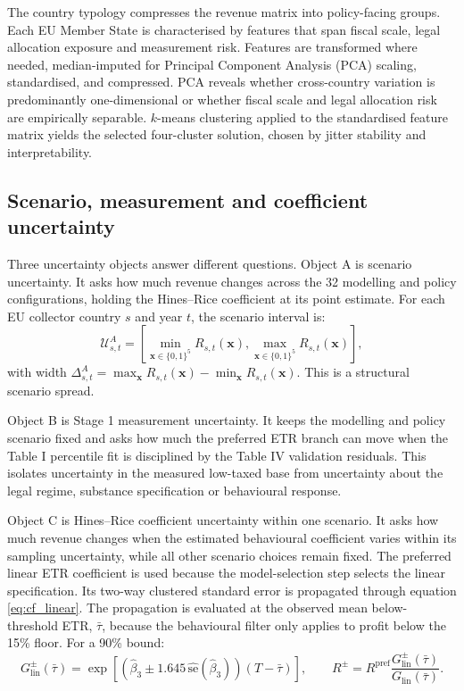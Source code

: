 \documentclass[11pt,a4paper]{article}
\begin{document}
The country typology compresses the revenue matrix into policy-facing groups. Each EU Member State is characterised by features that span fiscal scale, legal allocation exposure and measurement risk. Features are transformed where needed, median-imputed for Principal Component Analysis (PCA) scaling, standardised, and compressed. PCA reveals whether cross-country variation is predominantly one-dimensional or whether fiscal scale and legal allocation risk are empirically separable. $k$-means clustering applied to the standardised feature matrix yields the selected four-cluster solution, chosen by jitter stability and interpretability. 

\subsection{Scenario, measurement and coefficient uncertainty}\label{sec:two_uncertainties}

Three uncertainty objects answer different questions. Object A is scenario uncertainty. It asks how much revenue changes across the 32 modelling and policy configurations, holding the Hines--Rice coefficient at its point estimate. For each EU collector country $s$ and year $t$, the scenario interval is:
\begin{equation}\label{eq:object_a}
\mathcal{U}^{A}_{s,t}
=
\left[
\min_{\mathbf{x}\in\{0,1\}^5} R_{s,t}(\mathbf{x}),
\max_{\mathbf{x}\in\{0,1\}^5} R_{s,t}(\mathbf{x})
\right],
\end{equation}
with width $\Delta^{A}_{s,t}=\max_{\mathbf{x}}R_{s,t}(\mathbf{x})-\min_{\mathbf{x}}R_{s,t}(\mathbf{x})$. This is a structural scenario spread.

Object B is Stage 1 measurement uncertainty. It keeps the modelling and policy scenario fixed and asks how much the preferred ETR branch can move when the Table I percentile fit is disciplined by the Table IV validation residuals. This isolates uncertainty in the measured low-taxed base from uncertainty about the legal regime, substance specification or behavioural response.

Object C is Hines--Rice coefficient uncertainty within one scenario. It asks how much revenue changes when the estimated behavioural coefficient varies within its sampling uncertainty, while all other scenario choices remain fixed. The preferred linear ETR coefficient is used because the model-selection step selects the linear specification. Its two-way clustered standard error is propagated through equation \eqref{eq:cf_linear}. The propagation is evaluated at the observed mean below-threshold ETR, $\bar{\tau}$, because the behavioural filter only applies to profit below the 15\% floor. For a 90\% bound:
\begin{equation}\label{eq:object_c_approx}
G_{\text{lin}}^{\pm}(\bar{\tau})
=
\exp\!\left[
\left(\hat{\beta}_3 \pm 1.645\,\widehat{\text{se}}(\hat{\beta}_3)\right)
(T-\bar{\tau})
\right],
\qquad
R^{\pm}
=
R^{\text{pref}}\frac{G_{\text{lin}}^{\pm}(\bar{\tau})}{G_{\text{lin}}(\bar{\tau})}.
\end{equation}
\end{document}
